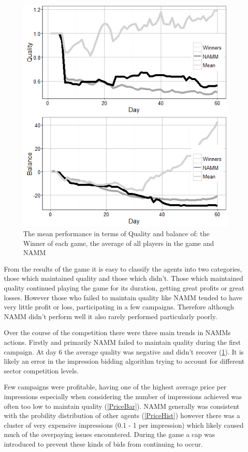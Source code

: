 \documentclass{sig-alternate-05-2015}
\begin{document}
\begin{figure}
\centering
\includegraphics[width = .7\linewidth]{AvsPlot.png}
\caption{The mean performance in terms of Quality and balance of: the Winner of each game, the average of all players in the game and NAMM}
\label{AvsPlot}
\end{figure}
From the results of the game it is easy to classify the agents into two categories, those which maintained quality and those which didn't. Those which maintained quality continued playing the game for its duration, getting great profits or great losses. However those who failed to maintain quality like NAMM tended to have very little profit or loss, participating in a few campaigns. Therefore although NAMM didn't perform well it also rarely performed particularly poorly. 

Over the course of the competition there were three main trends in NAMMs actions. Firstly and primarily NAMM failed to maintain quality during the first campaign. At day 6 the average quality was negative and didn't recover (\ref{AvsPlot}). It is likely an error in the impression bidding algorithm trying to account for different sector competition levels. 

Few campaigns were profitable, having one of the highest average price per impressions especially when considering the number of impressions achieved was often too low to maintain quality (\ref{PriceBar}). NAMM generally was consistent with the probility distribution of other agents  (\ref{PriceHist}) however there was a cluster of very expensive impressions (0.1 - 1 per impression) which likely caused much of the overpaying issues encountered. During the game a cap was introduced to prevent these kinds of bids from continuing to occur. 
\end{document}
